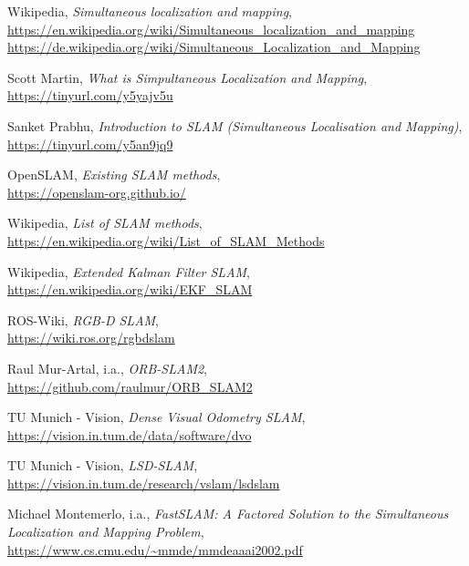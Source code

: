 
\begin{thebibliography}{99}

 Wikipedia,
\emph{Simultaneous localization and mapping},   \\
\url{https://en.wikipedia.org/wiki/Simultaneous_localization_and_mapping} \\
\url{https://de.wikipedia.org/wiki/Simultaneous_Localization_and_Mapping}

 Scott Martin,
\emph{What is Simpultaneous Localization and Mapping},  \\
\url{https://tinyurl.com/y5yajv5u}
\

 Sanket Prabhu,
\emph{Introduction to SLAM (Simultaneous Localisation and Mapping)},    \\
\url{https://tinyurl.com/y5an9jq9}

 OpenSLAM,
\emph{Existing SLAM methods},   \\
\url{https://openslam-org.github.io/}

 Wikipedia,
\emph{List of SLAM methods},    \\
\url{https://en.wikipedia.org/wiki/List_of_SLAM_Methods}

 Wikipedia,
\emph{Extended Kalman Filter SLAM},    \\
\url{https://en.wikipedia.org/wiki/EKF_SLAM}

 ROS-Wiki,
\emph{RGB-D SLAM},  \\
\url{https://wiki.ros.org/rgbdslam}

 Raul Mur-Artal, i.a.,
\emph{ORB-SLAM2},   \\
\url{https://github.com/raulmur/ORB_SLAM2}

 TU Munich - Vision,
\emph{Dense Visual Odometry SLAM},  \\
\url{https://vision.in.tum.de/data/software/dvo}

 TU Munich - Vision,
\emph{LSD-SLAM},    \\
\url{https://vision.in.tum.de/research/vslam/lsdslam}

 Michael Montemerlo, i.a.,
\emph{FastSLAM: A Factored Solution to the Simultaneous Localization and Mapping Problem},   \\
\url{https://www.cs.cmu.edu/~mmde/mmdeaaai2002.pdf}


\end{thebibliography}
